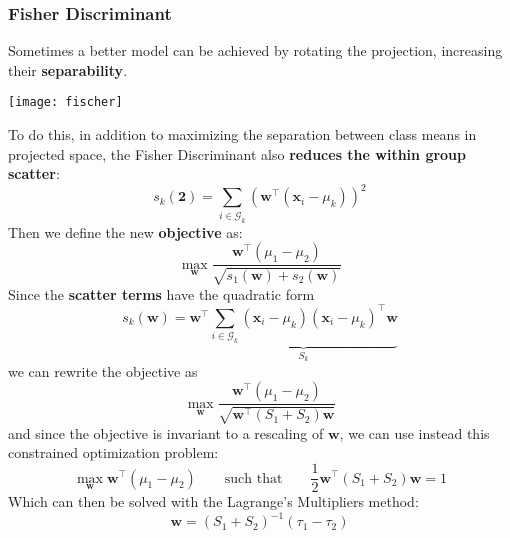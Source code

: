 \subsubsection{Fisher Discriminant}
Sometimes a better model can be achieved by rotating the projection, increasing their \textbf{separability}.
\begin{center}
	\texttt{[image: fischer]}
\end{center}
To do this, in addition to maximizing the separation between class means in projected space, the Fisher Discriminant also \textbf{reduces the within group scatter}:
\begin{equation}
	s_k(\mathbf{2}) = \sum_{i \in \mathcal{G}_k} (\mathbf{w}^\top (\mathbf{x}_i - \mu_k))^2
\end{equation}
Then we define the new \textbf{objective} as:
\begin{equation}
	\max_{\mathbf{w}} \frac{\mathbf{w}^\top (\mu_1 - \mu_2)}{\sqrt{s_1(\mathbf{w}) + s_2(\mathbf{w})}}
\end{equation}
Since the \textbf{scatter terms} have the quadratic form
\begin{equation*}
	s_k(\mathbf{w}) = \mathbf{w}^\top \underbrace{\sum_{i \in \mathcal{G}_k} (\mathbf{x}_i - \mu_k) (\mathbf{x}_i - \mu_k)^\top\mathbf{w}}_{S_k}
\end{equation*}
we can rewrite the objective as
\begin{equation}
	\max_{\mathbf{w}} \frac{\mathbf{w}^\top (\mu_1 - \mu_2)}{\sqrt{\mathbf{w}^\top (S_1 + S_2) \mathbf{w}}}
\end{equation}
and since the objective is invariant to a rescaling of $\mathbf{w}$, we can use instead this constrained optimization problem:
\begin{equation}
	\max_{\mathbf{w}} \mathbf{w}^\top (\mu_1 - \mu_2) \qquad \text{such that} \qquad \frac{1}{2} \mathbf{w}^\top (S_1+ S_2) \mathbf{w} = 1
\end{equation}
Which can then be solved with the Lagrange's Multipliers method:
\begin{equation*}
	\mathbf{w} = (S_1 + S_2)^{-1}(\tau_1 - \tau_2)
\end{equation*}
